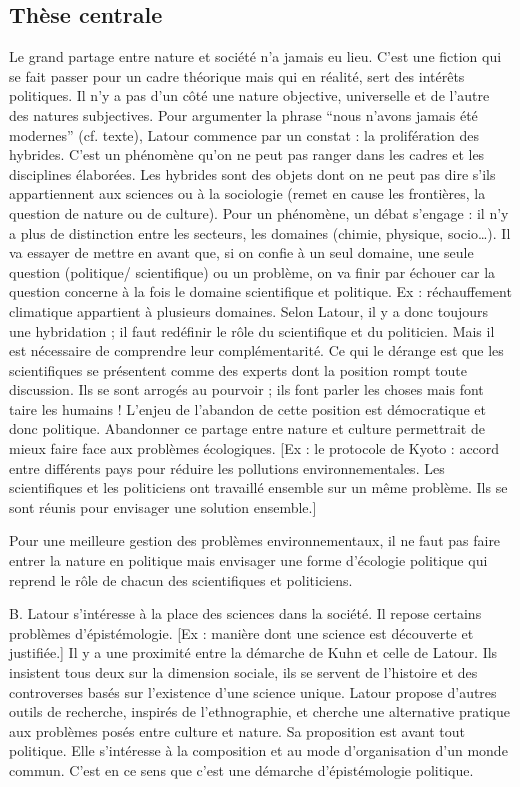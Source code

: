 \documentclass[11pt,a4paper]{article} %
\begin{document}
\subsection{Thèse centrale}
Le grand partage entre nature et société n'a jamais eu lieu.
C'est une fiction qui se fait passer pour un cadre théorique mais qui en réalité, sert des intérêts politiques.
Il n'y a pas d'un côté une nature objective, universelle et de l'autre des natures subjectives.
Pour argumenter la phrase  ``nous n'avons jamais été modernes'' (cf. texte), Latour commence par un constat : la prolifération des hybrides.
C'est un phénomène qu'on ne peut pas ranger dans les cadres et les disciplines élaborées.
Les hybrides sont des objets dont on ne peut pas dire s'ils appartiennent aux sciences ou à la sociologie (remet en cause les frontières, la question de nature ou de culture).
Pour un phénomène, un débat s'engage : il n'y a plus de distinction entre les secteurs, les domaines (chimie, physique, socio…).
Il va essayer de mettre en avant que, si on confie à un seul domaine, une seule question (politique/ scientifique) ou un problème, on va finir par échouer car la question concerne à la fois le domaine scientifique et politique.
Ex : réchauffement climatique appartient à plusieurs domaines.
Selon Latour, il y a donc toujours une hybridation ; il faut redéfinir le rôle du scientifique et du politicien.
Mais il est nécessaire de comprendre leur complémentarité.
Ce qui le dérange est que les scientifiques se présentent comme des experts dont la position rompt toute discussion.
Ils se sont arrogés au pourvoir ; ils font parler les choses mais font taire les humains ! L'enjeu de l'abandon de cette position est démocratique et donc politique.
Abandonner ce partage entre nature et culture permettrait de mieux faire face aux problèmes écologiques.
[Ex : le protocole de Kyoto : accord entre différents pays pour réduire les pollutions environnementales.
Les scientifiques et les politiciens ont travaillé ensemble sur un même problème.
Ils se sont réunis pour envisager une solution ensemble.]

Pour une meilleure gestion des problèmes environnementaux, il ne faut pas faire entrer la nature en politique mais envisager une forme d'écologie politique qui reprend le rôle de chacun des scientifiques et politiciens.

B. Latour s'intéresse à la place des sciences dans la société.
Il repose certains problèmes d'épistémologie.
[Ex : manière dont une science est découverte et justifiée.] Il y a une proximité entre la démarche de Kuhn et celle de Latour.
Ils insistent tous deux sur la dimension sociale, ils se servent de l'histoire et des controverses basés sur l'existence d'une science unique.
Latour propose d'autres outils de recherche, inspirés de l'ethnographie, et cherche une alternative pratique aux problèmes posés entre culture et nature.
Sa proposition est avant tout politique.
Elle s'intéresse à la composition et au mode d'organisation d'un monde commun.
C'est en ce sens que c'est une démarche d'épistémologie politique.
\end{document}
